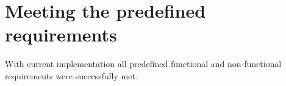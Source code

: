 \section{Meeting the predefined requirements}

With current implementation all predefined functional and non-functional requirements were successfully met.